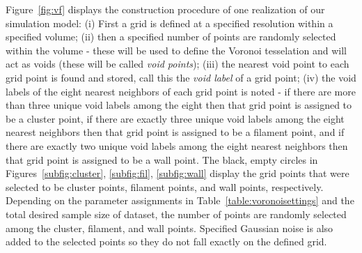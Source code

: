 \documentclass[12pt]{article}
\newcommand{\figref}[1]{Figure~\ref{#1}}
\begin{document}
\figref{fig:vf} displays the construction procedure of one realization of our simulation model:  (i) First a grid is defined at a specified resolution within a specified volume; (ii) then a specified number of points are randomly selected within the volume - these will be used to define the Voronoi tesselation and will act as voids (these will be called \emph{void points}); (iii) the nearest void point to each grid point is found and stored, call this the \emph{void label} of a grid point; (iv) the void labels of the eight nearest neighbors of each grid point is noted - if there are more than three unique void labels among the eight then that grid point is assigned to be a cluster point, if there are exactly three unique void labels among the eight nearest neighbors then that grid point is assigned to be a filament point, and if there are exactly two unique void labels among the eight nearest neighbors then that grid point is assigned to be a wall point. The black, empty circles in Figures~\ref{subfig:cluster}, \ref{subfig:fil}, \ref{subfig:wall} display the grid points that were selected to be cluster points, filament points, and wall points, respectively.  Depending on the parameter assignments in Table~\ref{table:voronoisettings} and the total desired sample size of dataset, the number of points are randomly selected among the cluster, filament, and wall points.  Specified Gaussian noise is also added to the selected points so they do not fall exactly on the defined grid.
\end{document}
